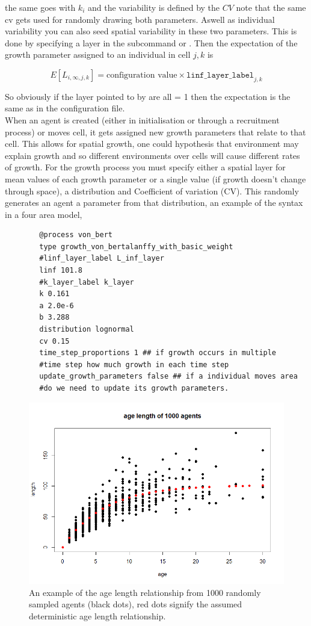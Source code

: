the same goes with $k_i$ and the variability is defined by the $CV$ note that the same cv gets used for randomly drawing both parameters. Aswell as individual variability you can also seed spatial variability in these two parameters. This is done by specifying a layer in the subcommand  or . Then the expectation of the growth parameter assigned to an individual in cell $j,k$ is 

$$E[L_{i,\infty,j,k}] = \text{configuration value}\times \texttt{linf\_layer\_label}_{j,k}$$

So obviously if the layer pointed to by  are all = 1 then the expectation is the same as in the configuration file.\\

When an agent is created (either in initialisation or through a recruitment process) or moves cell, it gets assigned new growth parameters that relate to that cell. This allows for spatial growth, one could hypothesis that environment may explain growth and so different environments over cells will cause different rates of growth. For the growth process you must specify either a spatial layer for mean values of each growth parameter or a single value (if growth doesn't change through space), a distribution and Coefficient of variation (CV). This randomly generates an agent a parameter from that distribution, an example of the syntax in a four area model,

{\small{\begin{verbatim}
		@process von_bert
		type growth_von_bertalanffy_with_basic_weight
		#linf_layer_label L_inf_layer
		linf 101.8
		#k_layer_label k_layer
		k 0.161
		a 2.0e-6 
		b 3.288
		distribution lognormal
		cv 0.15
		time_step_proportions 1 ## if growth occurs in multiple 
		#time step how much growth in each time step
		update_growth_parameters false ## if a individual moves area 
		#do we need to update its growth parameters.
		\end{verbatim}}}
\begin{figure}[h!]\label{fig:age_length}
	\centering
	\includegraphics[scale=0.6]{Figures/age-length.png}%
	\caption{An example of the age length relationship from 1000 randomly sampled agents (black dots), red dots signify the assumed deterministic age length relationship.}
\end{figure}


